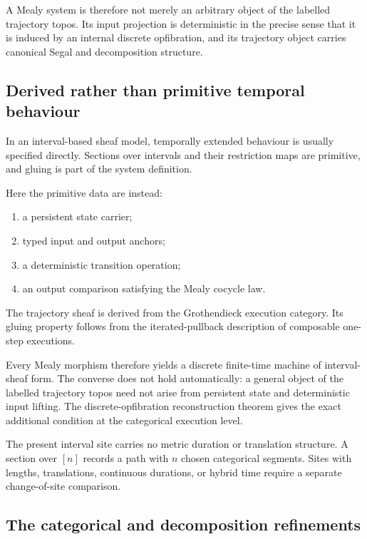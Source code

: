 A Mealy system is therefore not merely an arbitrary object of the labelled
trajectory topos. Its input projection is deterministic in the precise sense
that it is induced by an internal discrete opfibration, and its trajectory
object carries canonical Segal and decomposition structure.

\subsection{Derived rather than primitive temporal behaviour}
\label{subsec:derived-rather-than-primitive}

In an interval-based sheaf model, temporally extended behaviour is usually
specified directly. Sections over intervals and their restriction maps are
primitive, and gluing is part of the system definition.

Here the primitive data are instead:
\begin{enumerate}
    \item a persistent state carrier;
    \item typed input and output anchors;
    \item a deterministic transition operation;
    \item an output comparison satisfying the Mealy cocycle law.
\end{enumerate}
The trajectory sheaf is derived from the Grothendieck execution category. Its
gluing property follows from the iterated-pullback description of composable
one-step executions.

Every Mealy morphism therefore yields a discrete finite-time machine of
interval-sheaf form. The converse does not hold automatically: a general
object of the labelled trajectory topos need not arise from persistent state
and deterministic input lifting. The discrete-opfibration reconstruction
theorem gives the exact additional condition at the categorical execution
level.

The present interval site carries no metric duration or translation
structure. A section over \([n]\) records a path with \(n\) chosen
categorical segments. Sites with lengths, translations, continuous
durations, or hybrid time require a separate change-of-site comparison.

\subsection{The categorical and decomposition refinements}
\label{subsec:categorical-decomposition-refinements}

